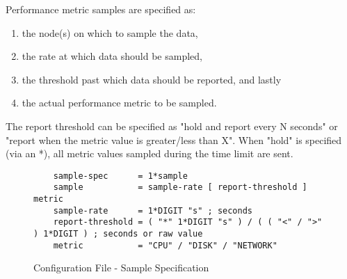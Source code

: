 Performance metric samples are specified as:

\begin{enumerate}
\item the node(s) on which to sample the data,
\item the rate at which data should be sampled,
\item the threshold past which data should be reported, and lastly
\item the actual performance metric to be sampled.
\end{enumerate}

The report threshold can be specified as "hold and report every N seconds" or "report when the metric value is
greater/less than X". When "hold" is specified (via an *), all metric values sampled during the time limit are sent.

\begin{figure}[ht]
    \begin{lstlisting}
    sample-spec      = 1*sample
    sample           = sample-rate [ report-threshold ] metric
    sample-rate      = 1*DIGIT "s" ; seconds
    report-threshold = ( "*" 1*DIGIT "s" ) / ( ( "<" / ">" ) 1*DIGIT ) ; seconds or raw value
    metric           = "CPU" / "DISK" / "NETWORK"
    \end{lstlisting}
    \caption{Configuration File - Sample Specification}
    \label{fig:config_file_sample}
\end{figure}

